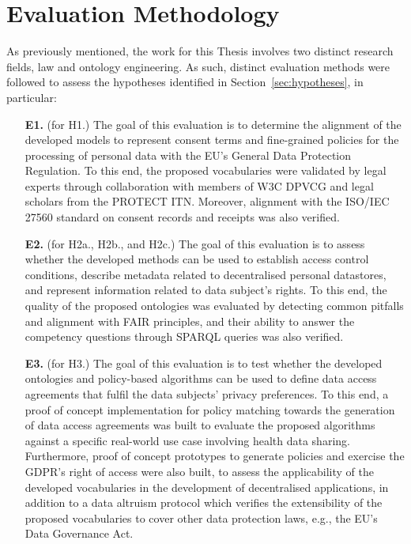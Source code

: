 \section{Evaluation Methodology}
\label{sec:eval_methodology}

As previously mentioned, the work for this Thesis involves two distinct research fields, law and ontology engineering.
As such, distinct evaluation methods were followed to assess the hypotheses identified in Section~\ref{sec:hypotheses}, in particular:

\begin{enumerate}
    \item [\textbf{E1.}] (for H1.) The goal of this evaluation is to determine the alignment of the developed models to represent consent terms and fine-grained policies for the processing of personal data with the EU's General Data Protection Regulation. To this end, the proposed vocabularies were validated by legal experts through collaboration with members of W3C DPVCG and legal scholars from the PROTECT ITN. Moreover, alignment with the ISO/IEC 27560 standard on consent records and receipts was also verified.
    \item [\textbf{E2.}] (for H2a., H2b., and H2c.) The goal of this evaluation is to assess whether the developed methods can be used to establish access control conditions, describe metadata related to decentralised personal datastores, and represent information related to data subject's rights. To this end, the quality of the proposed ontologies was evaluated by detecting common pitfalls and alignment with FAIR principles, and their ability to answer the competency questions through SPARQL queries was also verified.
    \item [\textbf{E3.}] (for H3.) The goal of this evaluation is to test whether the developed ontologies and policy-based algorithms can be used to define data access agreements that fulfil the data subjects' privacy preferences. To this end, a proof of concept implementation for policy matching towards the generation of data access agreements was built to evaluate the proposed algorithms against a specific real-world use case involving health data sharing. Furthermore, proof of concept prototypes to generate policies and exercise the GDPR's right of access were also built, to assess the applicability of the developed vocabularies in the development of decentralised applications, in addition to a data altruism protocol which verifies the extensibility of the proposed vocabularies to cover other data protection laws, e.g., the EU's Data Governance Act.
\end{enumerate}
